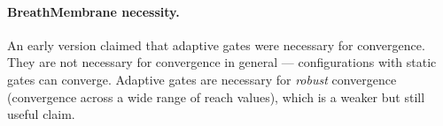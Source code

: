 \documentclass[sigconf,nonacm]{acmart}
\begin{document}
\paragraph{BreathMembrane necessity.}
An early version claimed that adaptive gates were necessary for
convergence. They are not necessary for convergence in general ---
configurations with static gates can converge. Adaptive gates are
necessary for \emph{robust} convergence (convergence across a wide range
of reach values), which is a weaker but still useful claim.




\end{document}
